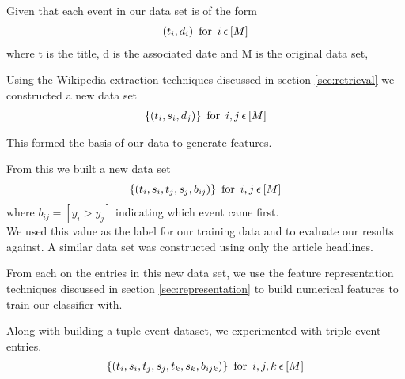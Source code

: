 \documentclass[bsc,frontabs,twoside,singlespacing,parskip,deptreport]{infthesis}     %
\begin{document}
 Given that each event in our data set is of the form
  \begin{eqnarray}
  (t_{i},d_{i}) \hspace{0.5em} \text{for} \hspace{0.5em} i \hspace{0.2em}\epsilon \hspace{0.2em} [M]\nonumber
    \end{eqnarray}
    where t is the title, d is the associated date and M is the original data set,

    Using the Wikipedia extraction techniques discussed in section \ref{sec:retrieval} we constructed a new data set
    \begin{eqnarray}
      \{(t_{i},s_{i},d_{j})\} \hspace{0.5em} \text{for} \hspace{0.5em}i,j  \hspace{0.2em}\epsilon \hspace{0.2em}[M]\nonumber
    \end{eqnarray}
    
    This formed the basis of our data to generate features.

    From this we built a new data set
    \begin{eqnarray}
      \{(t_{i},s_{i},t_{j},s_{j},b_{ij})\} \hspace{0.5em} \text{for} \hspace{0.5em} i,j \hspace{0.2em}\epsilon \hspace{0.2em}[M]\nonumber
    \end{eqnarray}
    where $b_{ij} = [y_{i} > y_{j}]$ indicating which event came first.\\
    We used this value as the label for our training data and to evaluate our results against.
    A similar data set was constructed using only the article headlines.
    
    From each on the entries in this new data set, we use the feature representation techniques discussed in section \ref{sec:representation} to build numerical
    features to train our classifier with.

Along with building a tuple event dataset, we experimented with triple event entries.
\begin{eqnarray}
      \{(t_{i},s_{i},t_{j},s_{j},t_{k},s_{k},b_{ijk})\} \hspace{0.5em} \text{for} \hspace{0.5em} i,j,k \hspace{0.2em}\epsilon \hspace{0.2em}[M]\nonumber
\end{eqnarray}
\end{document}
